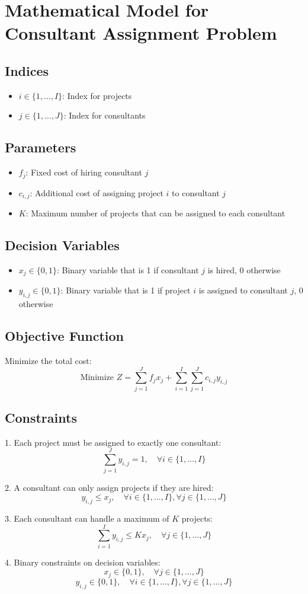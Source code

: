 \documentclass{article}
\begin{document}
\section*{Mathematical Model for Consultant Assignment Problem}

\subsection*{Indices}
\begin{itemize}
    \item $i \in \{1, \ldots, I\}$: Index for projects
    \item $j \in \{1, \ldots, J\}$: Index for consultants
\end{itemize}

\subsection*{Parameters}
\begin{itemize}
    \item $f_j$: Fixed cost of hiring consultant $j$
    \item $c_{i,j}$: Additional cost of assigning project $i$ to consultant $j$
    \item $K$: Maximum number of projects that can be assigned to each consultant
\end{itemize}

\subsection*{Decision Variables}
\begin{itemize}
    \item $x_{j} \in \{0, 1\}$: Binary variable that is 1 if consultant $j$ is hired, 0 otherwise
    \item $y_{i,j} \in \{0, 1\}$: Binary variable that is 1 if project $i$ is assigned to consultant $j$, 0 otherwise
\end{itemize}

\subsection*{Objective Function}
Minimize the total cost:
\[
\text{Minimize } Z = \sum_{j=1}^{J} f_j x_j + \sum_{i=1}^{I} \sum_{j=1}^{J} c_{i,j} y_{i,j}
\]

\subsection*{Constraints}
1. Each project must be assigned to exactly one consultant:
\[
\sum_{j=1}^{J} y_{i,j} = 1, \quad \forall i \in \{1, \ldots, I\}
\]
  
2. A consultant can only assign projects if they are hired:
\[
y_{i,j} \leq x_j, \quad \forall i \in \{1, \ldots, I\}, \forall j \in \{1, \ldots, J\}
\]

3. Each consultant can handle a maximum of $K$ projects:
\[
\sum_{i=1}^{I} y_{i,j} \leq K x_j, \quad \forall j \in \{1, \ldots, J\}
\]

4. Binary constraints on decision variables:
\[
x_j \in \{0, 1\}, \quad \forall j \in \{1, \ldots, J\}
\]
\[
y_{i,j} \in \{0, 1\}, \quad \forall i \in \{1, \ldots, I\}, \forall j \in \{1, \ldots, J\}
\]
\end{document}
